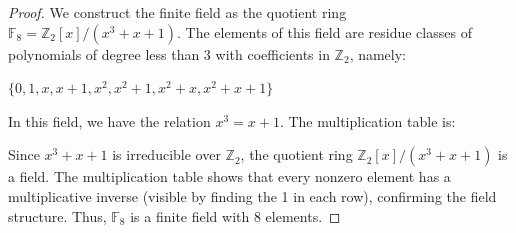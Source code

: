 \documentclass[a4paper]{article}
\begin{document}
\begin{proof}
We construct the finite field as the quotient ring $\mathbb{F}_8 = \mathbb{Z}_{2}[x]/(x^3 + x + 1)$. The elements of this field are residue classes of polynomials of degree less than 3 with coefficients in $\mathbb{Z}_2$, namely:
\begin{center}
$\{0, 1, x, x+1, x^2, x^2+1, x^2+x, x^2+x+1\}$
\end{center}
In this field, we have the relation $x^3 = x + 1$. The multiplication table is:
\begin{center}
\centering
{}
\end{center}
Since $x^3 + x + 1$ is irreducible over $\mathbb{Z}_2$, the quotient ring $\mathbb{Z}_{2}[x]/(x^3 + x + 1)$ is a field. The multiplication table shows that every nonzero element has a multiplicative inverse (visible by finding the 1 in each row), confirming the field structure. Thus, $\mathbb{F}_8$ is a finite field with 8 elements.
\end{proof}
\end{document}
